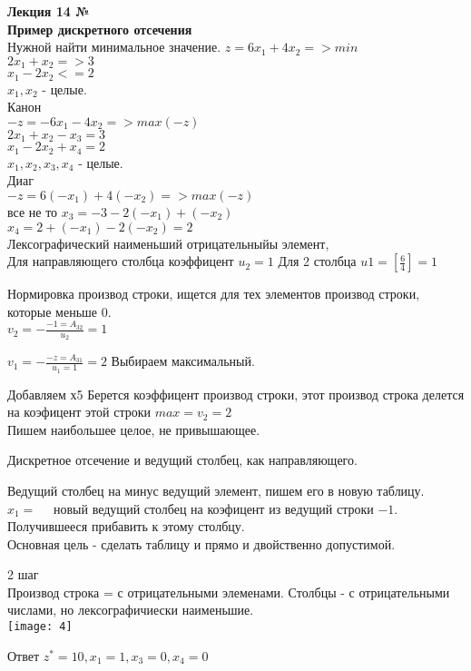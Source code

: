 

\LARGE{ \textbf {Лекция 14 №}}\\
\Large{ \textbf {Пример дискретного отсечения}}\\
Нужной найти минимальное значение.
$z = 6x_1 + 4x_2 => min $\\
$2x_1 +x_2 => 3$\\
$x_1 - 2x_2 <= 2$\\
$x_1 , x_2$ - целые.\\

Канон\\
$-z = -6x_1 - 4x_2 => max(-z) $\\
$2x_1 +x_2 - x_3 = 3$\\
$x_1 - 2x_2 + x_4= 2$\\
$x_1 , x_2,x_3,x_4$ - целые.\\

Диаг\\
$-z = 6(-x_1) + 4(-x_2) => max(-z) $\\ все не то
$x_3 = -3 - 2(-x_1) +(-x_2) $\\
$x_4 =  2 +  (-x_1) -2(-x_2)= 2$\\
Лексографический наименьший отрицательныйы элемент, \\
Для направляющего столбца коэффицент $u_2 = 1$
Для 2 столбца $u1 = [\frac{6}{4}] = 1$

Нормировка  производ строки, ищется для тех элементов производ строки, которые меньше 0.\\

$v_2 = - \frac{-1 = A_{32}}{u_2} = 1$

$v_1 = - \frac{-z = A_{31}}{u_1 = 1} = 2$
Выбираем максимальный.

Добавляем х5
Берется коэффицент производ строки, этот производ строка делется на  коэфицент этой строки $max = v_2 = 2$\\
Пишем наибольшее целое, не привышающее.

Дискретное отсечение и ведущий столбец, как направляющего.

Ведущий столбец на минус ведущий элемент, пишем его в новую таблицу.\\
$x_1 = \quad $ новый ведущий столбец на коэфицент из ведущий строки $-1$. Получившееся прибавить к этому столбцу.\\
Основная цель - сделать таблицу и прямо и двойственно допустимой.

2 шаг\\
Производ строка = с отрицательными элеменами.
Столбцы - с отрицательными числами, но лексографичиески наименьшие.\\

\texttt{[image: 4]}


Ответ $z^* = 10, x_1 = 1, x_3=0, x_4 = 0$




